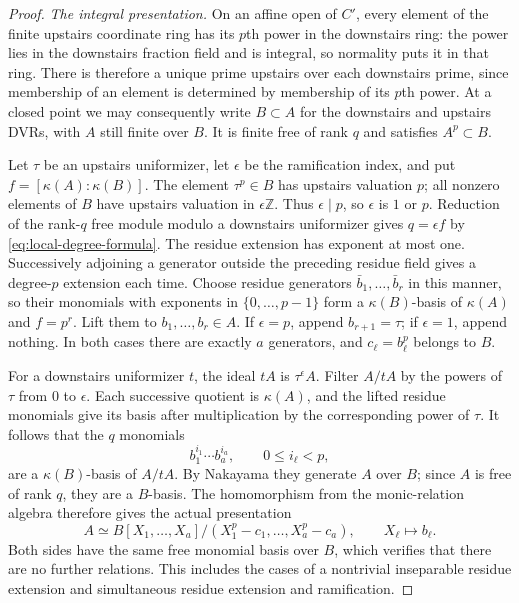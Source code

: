 \begin{proof}
\textit{The integral presentation.}
On an affine open of $C'$, every element of the finite upstairs
coordinate ring has its $p$th power in the downstairs ring: the power
lies in the downstairs fraction field and is integral, so normality
puts it in that ring.  There is therefore a unique prime upstairs over
each downstairs prime, since membership of an element is determined
by membership of its $p$th power.  At a closed point we may consequently
write $B\subset A$ for the downstairs and upstairs DVRs, with $A$ still
finite over $B$.  It is finite free of rank $q$ and satisfies
$A^p\subset B$.

Let $\tau$ be an upstairs uniformizer, let $\epsilon$ be the
ramification index, and put $f=[\kappa(A):\kappa(B)]$.
The element $\tau^p\in B$ has upstairs valuation $p$; all nonzero
elements of $B$ have upstairs valuation in $\epsilon\mathbb Z$.
Thus $\epsilon\mid p$, so $\epsilon$ is $1$ or $p$.
Reduction of the rank-$q$ free module modulo a downstairs uniformizer
gives $q=\epsilon f$ by \eqref{eq:local-degree-formula}.
The residue extension has exponent at most one.  Successively
adjoining a generator outside the preceding residue field gives a
degree-$p$ extension each time.  Choose residue generators
$\bar b_1,\ldots,\bar b_r$ in this manner, so their monomials with
exponents in $\{0,\ldots,p-1\}$ form a $\kappa(B)$-basis of $\kappa(A)$
and $f=p^r$.  Lift them to $b_1,\ldots,b_r\in A$.  If $\epsilon=p$,
append $b_{r+1}=\tau$; if $\epsilon=1$, append nothing.  In both cases
there are exactly $a$ generators, and $c_\ell=b_\ell^p$ belongs to $B$.

For a downstairs uniformizer $t$, the ideal $tA$ is
$\tau^\epsilon A$.  Filter $A/tA$ by the powers of $\tau$ from $0$ to
$\epsilon$.  Each successive quotient is $\kappa(A)$, and the lifted
residue monomials give its basis after multiplication by the
corresponding power of $\tau$.  It follows that the $q$ monomials
\[
 b_1^{i_1}\cdots b_a^{i_a},\qquad 0\le i_\ell<p,
\]
are a $\kappa(B)$-basis of $A/tA$.
By Nakayama they generate $A$ over $B$; since $A$ is free of rank $q$,
they are a $B$-basis.  The homomorphism from the monic-relation algebra
therefore gives the actual presentation
\begin{equation}
 A\simeq
 B[X_1,\ldots,X_a]/(X_1^p-c_1,\ldots,X_a^p-c_a),
 \qquad X_\ell\longmapsto b_\ell.
 \label{eq:height-one-dvr-presentation}
\end{equation}
Both sides have the same free monomial basis over $B$, which verifies
that there are no further relations.  This includes the cases of a
nontrivial inseparable residue extension and simultaneous residue
extension and ramification.


\end{proof}
